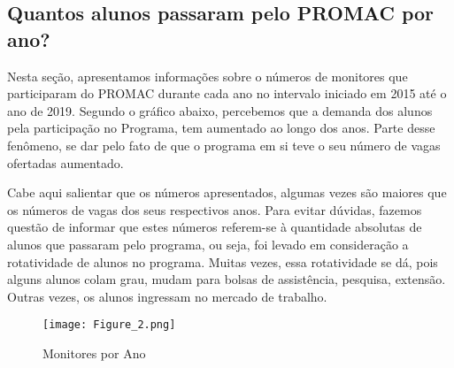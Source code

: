 \documentclass[12pt,a4paper]{article}
\begin{document}







		\subsection{Quantos alunos passaram pelo PROMAC por ano?}
		
		Nesta seção, apresentamos informações sobre o números de monitores que participaram do PROMAC durante cada ano no 				intervalo iniciado em 2015 até o ano de 2019. Segundo o gráfico abaixo, percebemos que a demanda dos alunos pela 				participação no Programa, tem aumentado ao longo dos anos. Parte desse fenômeno, se dar pelo fato de que o programa 			em si teve o seu número de vagas ofertadas aumentado.
		
		Cabe aqui salientar que os números apresentados, algumas vezes são maiores que os números de vagas dos seus 					respectivos anos. Para evitar dúvidas, fazemos questão de informar que estes números referem-se à quantidade 					absolutas de alunos que passaram pelo programa, ou seja, foi levado em consideração a rotatividade de alunos no 				programa. Muitas vezes, essa rotatividade se dá, pois alguns alunos colam grau, mudam para bolsas de assistência, 				pesquisa, extensão. Outras vezes, os alunos ingressam no mercado de trabalho. 
		
			\begin{figure}[htb]
        		\centering
        		\texttt{[image: Figure\_2.png]}
        		\caption{Monitores por Ano}
        		\label{Monitores-Ano}
    		\end{figure}
    		
    	\pagebreak
    	
\end{document}
